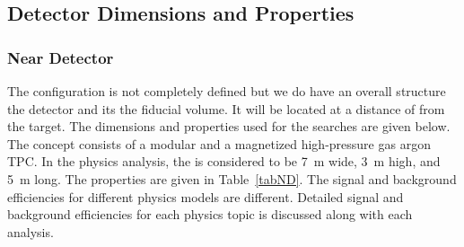 \begin{table}[h]
    \begin{center}
        \end{center}
        \caption{\label{tabBC} Beam Power Configurations used for  and  }
    \end{table} 

\subsection{Detector Dimensions and Properties}
\subsubsection{Near Detector}

The  configuration is not completely defined but we do have an overall structure the detector and its the fiducial volume. %
It will be located at a distance of \ndfromtarget from the target. The  dimensions and properties used for the  searches are given below.
The   concept %
consists of a modular \lartpc and a magnetized high-pressure gas argon TPC. In the  physics analysis, %
the \lartpc is considered to be \SI{7}{m} wide, \SI{3}{m} high, and \SI{5}{m} long. 
The  properties are given in Table~\ref{tabND}. The signal and background efficiencies for different physics models are different. %
Detailed signal and background efficiencies for each physics topic is discussed along with each analysis.

